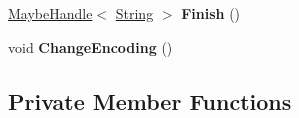 \begin{DoxyCompactItemize}
\item 
\hyperlink{classv8_1_1internal_1_1_maybe_handle}{Maybe\+Handle}$<$ \hyperlink{classv8_1_1internal_1_1_string}{String} $>$ {\bfseries Finish} ()\hypertarget{classv8_1_1internal_1_1_incremental_string_builder_a0abca58c430ebdda0937a26c580040f5}{}\label{classv8_1_1internal_1_1_incremental_string_builder_a0abca58c430ebdda0937a26c580040f5}

\item 
void {\bfseries Change\+Encoding} ()\hypertarget{classv8_1_1internal_1_1_incremental_string_builder_a0b8605c2f8efbc2a7b84092ae95b462a}{}\label{classv8_1_1internal_1_1_incremental_string_builder_a0b8605c2f8efbc2a7b84092ae95b462a}

\end{DoxyCompactItemize}
\subsection*{Private Member Functions}
